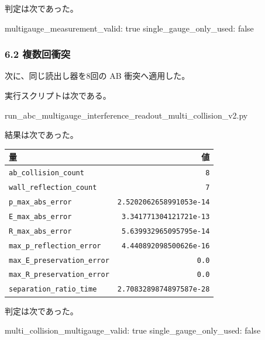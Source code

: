 \documentclass[
  a4paper,
]{article}
\newenvironment{Shaded}{}{}
\newcommand{\NormalTok}[1]{#1}
\newcounter{none} %
\begin{document}
判定は次であった。

\begin{Shaded}
\begin{Highlighting}[]
\NormalTok{multigauge\_measurement\_valid: true}
\NormalTok{single\_gauge\_only\_used: false}
\end{Highlighting}
\end{Shaded}

\subsubsection{6.2 複数回衝突}\label{ux8907ux6570ux56deux885dux7a81}

次に、同じ読出し器を8回の AB 衝突へ適用した。

実行スクリプトは次である。

\begin{Shaded}
\begin{Highlighting}[]
\NormalTok{run\_abc\_multigauge\_interference\_readout\_multi\_collision\_v2.py}
\end{Highlighting}
\end{Shaded}

結果は次であった。

{\def\LTcaptype{none} %
\begin{longtable}[]{@{}lr@{}}
\toprule\noalign{}
量 & 値 \\
\midrule\noalign{}
\endhead
\bottomrule\noalign{}
\endlastfoot
\texttt{ab\_collision\_count} & \texttt{8} \\
\texttt{wall\_reflection\_count} & \texttt{7} \\
\texttt{p\_max\_abs\_error} & \texttt{2.5202062658991053e-14} \\
\texttt{E\_max\_abs\_error} & \texttt{3.341771304121721e-13} \\
\texttt{R\_max\_abs\_error} & \texttt{5.639932965095795e-14} \\
\texttt{max\_p\_reflection\_error} & \texttt{4.440892098500626e-16} \\
\texttt{max\_E\_preservation\_error} & \texttt{0.0} \\
\texttt{max\_R\_preservation\_error} & \texttt{0.0} \\
\texttt{separation\_ratio\_time} & \texttt{2.7083289874897587e-28} \\
\end{longtable}
}

判定は次であった。

\begin{Shaded}
\begin{Highlighting}[]
\NormalTok{multi\_collision\_multigauge\_valid: true}
\NormalTok{single\_gauge\_only\_used: false}
\end{Highlighting}
\end{Shaded}
\end{document}
